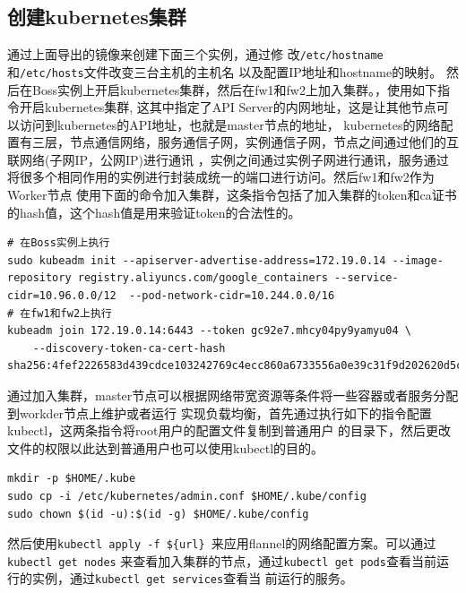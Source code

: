 \documentclass{article}
\begin{document}
\subsection{创建kubernetes集群}
\indent 通过上面导出的镜像来创建下面三个实例，通过修
改\texttt{/etc/hostname}和\texttt{/etc/hosts}文件改变三台主机的主机名
以及配置IP地址和hostname的映射。
然后在Boss实例上开启kubernetes集群，然后在fw1和fw2上加入集群。，使用如下指令开启kubernetes集群,
这其中指定了API Server的内网地址，这是让其他节点可以访问到kubernetes的API地址，也就是master节点的地址，
kubernetes的网络配置有三层，节点通信网络，服务通信子网，实例通信子网，节点之间通过他们的互联网络(子网IP，公网IP)进行通讯
，实例之间通过实例子网进行通讯，服务通过将很多个相同作用的实例进行封装成统一的端口进行访问。然后fw1和fw2作为Worker节点
使用下面的命令加入集群，这条指令包括了加入集群的token和ca证书的hash值，这个hash值是用来验证token的合法性的。
\begin{lstlisting}[style=bashstyle]
# 在Boss实例上执行
sudo kubeadm init --apiserver-advertise-address=172.19.0.14 --image-repository registry.aliyuncs.com/google_containers --service-cidr=10.96.0.0/12  --pod-network-cidr=10.244.0.0/16
# 在fw1和fw2上执行
kubeadm join 172.19.0.14:6443 --token gc92e7.mhcy04py9yamyu04 \
    --discovery-token-ca-cert-hash sha256:4fef2226583d439cdce103242769c4ecc860a6733556a0e39c31f9d202620d5c
\end{lstlisting}
通过加入集群，master节点可以根据网络带宽资源等条件将一些容器或者服务分配到workder节点上维护或者运行
实现负载均衡，首先通过执行如下的指令配置kubectl，这两条指令将root用户的配置文件复制到普通用户
的目录下，然后更改文件的权限以此达到普通用户也可以使用kubectl的目的。
\begin{lstlisting}[style=bashstyle]
mkdir -p $HOME/.kube
sudo cp -i /etc/kubernetes/admin.conf $HOME/.kube/config
sudo chown $(id -u):$(id -g) $HOME/.kube/config
\end{lstlisting}
然后使用\texttt{kubectl apply -f \$\{url\} }来应用flannel的网络配置方案。可以通过\texttt{kubectl get nodes}
来查看加入集群的节点，通过\texttt{kubectl get pods}查看当前运行的实例，通过\texttt{kubectl get services}查看当
前运行的服务。
\end{document}
